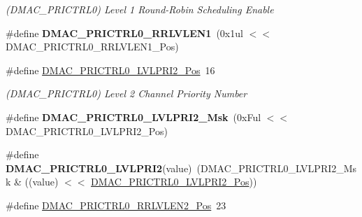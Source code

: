 \begin{DoxyCompactItemize}
\begin{DoxyCompactList}\small\item\em (D\+M\+A\+C\+\_\+\+P\+R\+I\+C\+T\+R\+L0) Level 1 Round-\/\+Robin Scheduling Enable \end{DoxyCompactList}\item 
\hypertarget{group___s_a_m_l21___d_m_a_c_gaf7737ca0c70e545a1232416ec87c1aeb}{}\#define {\bfseries D\+M\+A\+C\+\_\+\+P\+R\+I\+C\+T\+R\+L0\+\_\+\+R\+R\+L\+V\+L\+E\+N1}~(0x1ul $<$$<$ D\+M\+A\+C\+\_\+\+P\+R\+I\+C\+T\+R\+L0\+\_\+\+R\+R\+L\+V\+L\+E\+N1\+\_\+\+Pos)\label{group___s_a_m_l21___d_m_a_c_gaf7737ca0c70e545a1232416ec87c1aeb}

\item 
\hypertarget{group___s_a_m_l21___d_m_a_c_ga75982e37aa713a100ebd69c26d3c4512}{}\#define \hyperlink{group___s_a_m_l21___d_m_a_c_ga75982e37aa713a100ebd69c26d3c4512}{D\+M\+A\+C\+\_\+\+P\+R\+I\+C\+T\+R\+L0\+\_\+\+L\+V\+L\+P\+R\+I2\+\_\+\+Pos}~16\label{group___s_a_m_l21___d_m_a_c_ga75982e37aa713a100ebd69c26d3c4512}

\begin{DoxyCompactList}\small\item\em (D\+M\+A\+C\+\_\+\+P\+R\+I\+C\+T\+R\+L0) Level 2 Channel Priority Number \end{DoxyCompactList}\item 
\hypertarget{group___s_a_m_l21___d_m_a_c_ga0d9419c1a8b659b29c97510437a73bfd}{}\#define {\bfseries D\+M\+A\+C\+\_\+\+P\+R\+I\+C\+T\+R\+L0\+\_\+\+L\+V\+L\+P\+R\+I2\+\_\+\+Msk}~(0x\+Ful $<$$<$ D\+M\+A\+C\+\_\+\+P\+R\+I\+C\+T\+R\+L0\+\_\+\+L\+V\+L\+P\+R\+I2\+\_\+\+Pos)\label{group___s_a_m_l21___d_m_a_c_ga0d9419c1a8b659b29c97510437a73bfd}

\item 
\hypertarget{group___s_a_m_l21___d_m_a_c_gab268beffb26ae3502da4e9bc9afab841}{}\#define {\bfseries D\+M\+A\+C\+\_\+\+P\+R\+I\+C\+T\+R\+L0\+\_\+\+L\+V\+L\+P\+R\+I2}(value)~(D\+M\+A\+C\+\_\+\+P\+R\+I\+C\+T\+R\+L0\+\_\+\+L\+V\+L\+P\+R\+I2\+\_\+\+Msk \& ((value) $<$$<$ \hyperlink{group___s_a_m_l21___d_m_a_c_ga75982e37aa713a100ebd69c26d3c4512}{D\+M\+A\+C\+\_\+\+P\+R\+I\+C\+T\+R\+L0\+\_\+\+L\+V\+L\+P\+R\+I2\+\_\+\+Pos}))\label{group___s_a_m_l21___d_m_a_c_gab268beffb26ae3502da4e9bc9afab841}

\item 
\hypertarget{group___s_a_m_l21___d_m_a_c_gaa2632285eb37ca8a14813717926e30af}{}\#define \hyperlink{group___s_a_m_l21___d_m_a_c_gaa2632285eb37ca8a14813717926e30af}{D\+M\+A\+C\+\_\+\+P\+R\+I\+C\+T\+R\+L0\+\_\+\+R\+R\+L\+V\+L\+E\+N2\+\_\+\+Pos}~23\label{group___s_a_m_l21___d_m_a_c_gaa2632285eb37ca8a14813717926e30af}


\end{DoxyCompactItemize}
